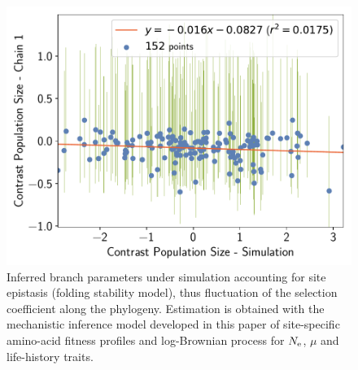 \documentclass{article}
\begin{document}
\begin{figure}[H]
\begin{minipage}{0.32\linewidth}
			\includegraphics[width=\linewidth, page=1]{simulations/SimuFold_SiteMutSelBranchNe_BranchCorrelation_ContrastPopulationSize}
		\end{minipage} \hfill
		\caption[Inferred branch parameters for \texttt{SimuFold}]{
		Inferred branch parameters under simulation accounting for site epistasis (folding stability model), thus fluctuation of the selection coefficient along the phylogeny.
		Estimation is obtained with the mechanistic inference model developed in this paper of site-specific amino-acid fitness profiles and log-Brownian process for $\Ne$, $\mu$ and life-history traits.
		}
	\end{figure}

	\begin{table}[H]
		\centering
		\noindent{}
		\caption[Amino-acid entropy in \texttt{SimuFold}]{
		Estimated amino-acid entropy under simulation accounting for site epistasis (folding stability model), thus fluctuation of the selection coefficient along the phylogeny.
		Obtained with the mechanistic inference model developed in this paper of site-specific amino-acid fitness profiles and log-Brownian process for $\Ne$, $\mu$ and life-history traits (in the left column), or under the assumption of constant $\Ne$ (in the right column).}
	\end{table}
\end{document}
